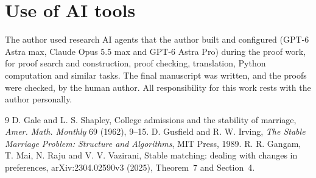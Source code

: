 \documentclass[11pt]{amsart}
\theoremstyle{definition}
\theoremstyle{remark}
\begin{document}
\section*{Use of AI tools}
The author used research AI agents that the author built and configured (GPT-6 Astra max,
Claude Opus 5.5 max and GPT-6 Astra Pro) during the proof work, for proof search and
construction, proof checking, translation, Python computation and similar tasks. The final
manuscript was written, and the proofs were checked, by the human author. All responsibility
for this work rests with the author personally.

\begin{thebibliography}{9}
 D. Gale and L. S. Shapley, College admissions and the stability of marriage, \emph{Amer. Math. Monthly} 69 (1962), 9--15.
 D. Gusfield and R. W. Irving, \emph{The Stable Marriage Problem: Structure and Algorithms}, MIT Press, 1989.
 R. R. Gangam, T. Mai, N. Raju and V. V. Vazirani, Stable matching: dealing with changes in preferences, arXiv:2304.02590v3 (2025), Theorem~7 and Section~4.
\end{thebibliography}
\end{document}
